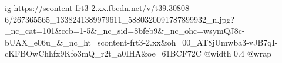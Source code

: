  
 
 
 
 

\ifcmt
  ig https://scontent-frt3-2.xx.fbcdn.net/v/t39.30808-6/267365565_1338241389979611_5880320091787899932_n.jpg?_nc_cat=101&ccb=1-5&_nc_sid=8bfeb9&_nc_ohc=wsymQJ8c-bUAX_e06u_&_nc_ht=scontent-frt3-2.xx&oh=00_AT8jUmwba3-vJB7qI-cKFBOwChhfx9Kfo3mQ_r2t_a0IHA&oe=61BCF72C
  @width 0.4
  @wrap 
\fi
